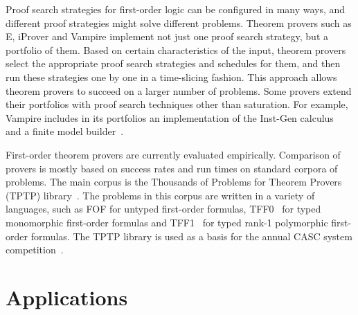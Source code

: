 
Proof search strategies for first-order logic can be configured in many ways, and different proof strategies might solve different problems. Theorem provers such as E, iProver and Vampire implement not just one proof search strategy, but a portfolio of them. Based on certain characteristics of the input, theorem provers select the appropriate proof search strategies and schedules for them, and then run these strategies one by one in a time-slicing fashion. This approach allows theorem provers to succeed on a larger number of problems. Some provers extend their portfolios with proof search techniques other than saturation. For example, Vampire includes in its portfolios an implementation of the Inst-Gen calculus~\cite{DBLP:conf/birthday/Korovin13} and a finite model builder~\cite{VampireFMB}.

First-order theorem provers are currently evaluated empirically. Comparison of provers is mostly based on success rates and run times on standard corpora of problems. The main corpus is the Thousands of Problems for Theorem Provers (TPTP) library~\cite{TPTP}. The problems in this corpus are written in a variety of languages, such as FOF for untyped first-order formulas, TFF0~\cite{tff0} for typed monomorphic first-order formulas and TFF1~\cite{tff1} for typed rank-1 polymorphic first-order formulas. The TPTP library is used as a basis for the annual CASC system competition~\cite{CASC}.

\section*{Applications}

